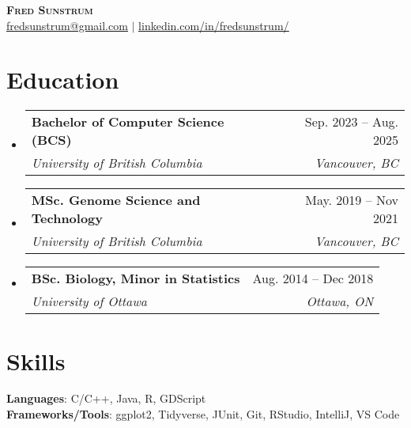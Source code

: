 \documentclass[letterpaper,11pt]{article}
\makeatletter
\newcommand{\resumeSubheading}[4]{
  \vspace{-2pt}\item
    \begin{tabular*}{0.97\textwidth}[t]{l@{\extracolsep{\fill}}r}
      \textbf{#1} & #2 \\
      \textit{\small#3} & \textit{\small #4} \\
    \end{tabular*}\vspace{-7pt}
}
\newcommand{\resumeSubHeadingListStart}{\begin{itemize}[leftmargin=0.15in, label={}]}
\newcommand{\resumeSubHeadingListEnd}{\end{itemize}}
\makeatother
\begin{document}

\begin{center}
    \textbf{\Huge \scshape Fred Sunstrum} \\ \vspace{1pt}\href{mailto:fr.sunstrum@gmail.com}{\underline{fredsunstrum@gmail.com}} $|$ 
    \href{https://linkedin.com/in/fredsunstrum/}{\underline{linkedin.com/in/fredsunstrum/}} %
\end{center}


\section{Education}
  \resumeSubHeadingListStart
    \resumeSubheading
      {Bachelor of Computer Science (BCS)}{Sep. 2023 -- Aug. 2025}
      {University of British Columbia}{Vancouver, BC}
    \resumeSubheading
      {MSc. Genome Science and Technology}{May. 2019 -- Nov 2021}          
      {University of British Columbia}{Vancouver, BC}
    \resumeSubheading
      {BSc. Biology, Minor in Statistics}{Aug. 2014 -- Dec 2018}
      {University of Ottawa}{Ottawa, ON}
      
  \resumeSubHeadingListEnd
%

\section{Skills}
 \begin{itemize}[leftmargin=0.15in, label={}]
    \small{\item{
     \textbf{Languages}{: C/C++, Java, R, GDScript} \\
     \textbf{Frameworks/Tools}{: ggplot2, Tidyverse, JUnit, Git, RStudio, IntelliJ,  VS Code} \\
    }}
 \end{itemize}

\end{document}
